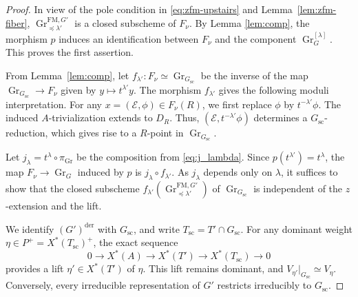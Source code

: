 \documentclass[a4paper, 12pt]{amsart}
\theoremstyle{definition}
\DeclareMathOperator{\Gr}{\mathrm{Gr}}
\begin{document}
\begin{proof}
In view of the pole condition in \eqref{eq:zfm-upstairs} and Lemma~\ref{lem:zfm-fiber}, 
$\Gr^{\mathrm{FM},G'}_{\preceq\lambda'}$ is a closed subscheme of $F_\nu$. 
By Lemma \ref{lem:comp}, the morphism $p$ induces an identification between $F_\nu$ and the component
$\Gr_G^{[\lambda]}$. This proves the first assertion.

From  Lemma~\ref{lem:comp}, 
let $f_{\lambda'}:F_\nu\simeq \Gr_{G_{\mathrm{sc}}}$
be the inverse of the map $\Gr_{G_{\mathrm{sc}}}\to F_\nu$ given by $y\mapsto t^{\lambda'}y$. 
The morphism $f_{\lambda'}$ gives the following moduli interpretation.  For any $x=(\mathscr E,\phi)\in F_\nu(R)$, we first replace
$\phi$ by $t^{-\lambda'}\phi$.  The induced $A$-trivialization extends
to $D_R$. Thus,  $(\mathscr E,t^{-\lambda'}\phi)$ determines a $G_{\mathrm{sc}}$-reduction, which gives rise to a $R$-point in $\Gr_{G_{\mathrm{sc}}}$.

Let $j_{\lambda}=t^{\lambda} \circ \pi_{\Gr}$ be the composition from \eqref{eq:j_lambda}. Since $p(t^{\lambda'})=t^\lambda$, the map $F_\nu\to\Gr_G$ induced by $p$ is $j_\lambda\circ f_{\lambda'}$.  As $j_\lambda$ depends only on
$\lambda$, it suffices to show that the closed subscheme
$f_{\lambda'}(\Gr^{\mathrm{FM},G'}_{\preceq\lambda'})$ of
$\Gr_{G_{\mathrm{sc}}}$ is independent of the $z$-extension and the lift.

We identify $(G')^{\mathrm{der}}$ with $G_{\mathrm{sc}}$, and write
$T_{\mathrm{sc}}=T'\cap G_{\mathrm{sc}}$. For any dominant weight
$\eta\in P^+=X^*(T_{\mathrm{sc}})^+$, the exact sequence
\[
0\to X^*(A)\to X^*(T')
\to X^*(T_{\mathrm{sc}})\to 0
\]
provides a lift $\eta'\in X^*(T')$ of $\eta$. This lift remains dominant, and
$V_{\eta'}|_{G_{\mathrm{sc}}}\simeq V_\eta$. Conversely, every irreducible
representation of $G'$ restricts irreducibly to $G_{\mathrm{sc}}$.


\end{proof}
\end{document}
